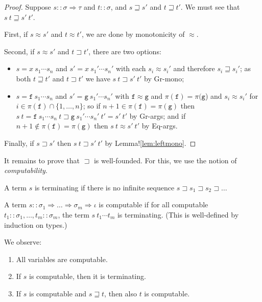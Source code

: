 \documentclass[a4paper,USenglish,cleveref,autoref,thm-restate]{lipics-v2021}
\newcommand{\arrtype}{\Rightarrow}
\newcommand{\grmain}{\sqsupset}
\newcommand{\geqmain}{\sqsupseteq}
\newcommand{\ismain}{\approx}
\newcommand{\symb}[1]{\mathtt{#1}}
\newcommand{\afun}{\symb{f}}
\newcommand{\bfun}{\symb{g}}
\newcommand{\atype}{\sigma}
\newcommand{\btype}{\tau}
\newcommand{\asort}{\iota}
\newcommand{\filter}{\pi}
\begin{document}
\begin{proof}
Suppose $s :: \atype \arrtype \btype$ and $t :: \atype$, and $s \geqmain s'$ and $t \geqmain t'$.
We must see that $s\ t \geqmain s'\ t'$.

First, if $s \ismain s'$ and $t \ismain t'$, we are done by monotonicity of $\ismain$.

Second, if $s \ismain s'$ and $t \grmain t'$, there are two options:
\begin{itemize}
\item $s = x\ s_1 \cdots s_n$ and $s' = x\ s_1' \cdots s_n'$ with each $s_i \ismain s_i'$ and
  therefore $s_i \geqmain s_i'$; as both $t \geqmain t'$ and $t \grmain t'$ we have $s\ t \grmain
  s'\ t'$ by Gr-mono;
\item $s = \afun\ s_1 \cdots s_n$ and $s' = \bfun\ s_1' \cdots s_n'$ with $\afun \approx \bfun$ and
  $\filter(\afun) = \filter(\bfun$) and $s_i \ismain s_i'$ for $i \in \filter(\afun) \cap \{1,\dots,
  n\}$;
  so if $n+1 \in \filter(\afun) = \filter(\bfun)$ then $s\ t = \afun\ s_1 \cdots s_n\ t \grmain
  \bfun\ s_1' \cdots s_n'\ t' = s'\ t'$ by Gr-args;
  and if $n+1 \notin \filter(\afun) = \filter(\bfun)$ then $s\ t \ismain s'\ t'$ by Eq-args.
\end{itemize}

Finally, if $s \grmain s'$ then $s\ t \grmain s'\ t'$ by Lemma!\ref{lem:leftmono}.
\end{proof}

It remains to prove that $\grmain$ is well-founded.  For this, we use the notion of
\emph{computability}.

\begin{definition}
A term $s$ is terminating if there is no infinite sequence $s \grmain s_1 \grmain s_2 \grmain \dots$

A term $s :: \atype_1 \arrtype \dots \arrtype \atype_m \arrtype \asort$ is computable if for all
computable $t_1 :: \atype_1,\dots,t_m :: \atype_m$, the term $s\ t_1 \cdots t_m$ is terminating.
(This is well-defined by induction on types.)
\end{definition}

\begin{lemma}\label{lem:computability:basics} We observe:
\begin{enumerate}
\item\label{lem:computability:basics:vars}
  All variables are computable.
\item\label{lem:computability:basics:compterm}
  If $s$ is computable, then it is terminating.
\item\label{lem:computability:basics:decrease}
  If $s$ is computable and $s \geqmain t$, then also $t$ is computable.
\end{enumerate}
\end{lemma}
\end{document}
